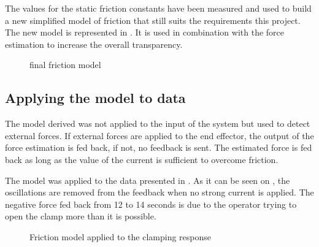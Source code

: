 The values for the static friction constants have been measured and used to build a new simplified model of friction that still suits the requirements this project. The new model is represented in . It is used in combination with the force estimation to increase the overall transparency.

\begin{figure}[h]
\centering
\caption{final friction model}
\label{fig:new_friction_model}
\end{figure}

\subsection{Applying the model to data}

The model derived was not applied to the input of the system but used to detect external forces. If external forces are applied to the end effector, the output of the force estimation is fed back, if not, no feedback is sent. The estimated force is fed back as long as the value of the current is sufficient to overcome friction.

The model was applied to the data presented in . As it can be seen on , the oscillations are removed from the feedback when no strong current is applied. The negative force fed back from 12 to 14 seconds is due to the operator trying to open the clamp more than it is possible. 
\begin{figure}[H]

\caption{Friction model applied to the clamping response}
\label{fig:friction_validation}
\end{figure}
